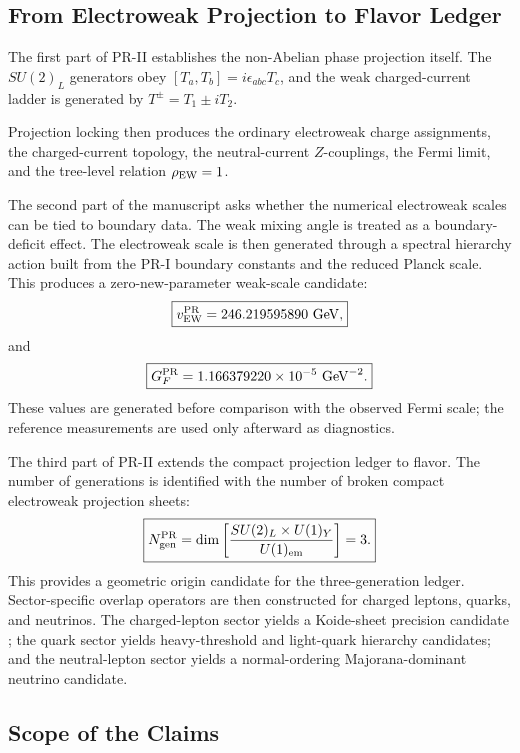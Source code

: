 \documentclass[11pt]{article}
\begin{document}
\subsection{From Electroweak Projection to Flavor Ledger}
\label{sec:intro_pr2_program}

The first part of PR-II establishes the non-Abelian phase projection itself. The \(SU(2)_L\) generators obey $[T_a,T_b] = i\epsilon_{abc}T_c$, and the weak charged-current ladder is generated by $T^\pm = T_1\pm iT_2.$

Projection locking then produces the ordinary electroweak charge assignments, the charged-current topology, the neutral-current \(Z\)-couplings, the Fermi limit, and the tree-level relation $\rho_{\rm EW}=1$.

The second part of the manuscript asks whether the numerical electroweak scales can be tied to boundary data. The weak mixing angle is treated as a boundary-deficit effect. The electroweak scale is then generated through a spectral hierarchy action built from the PR-I boundary constants and the reduced Planck scale. This produces a zero-new-parameter weak-scale candidate:
\begin{equation}
\boxed{
v_{\rm EW}^{\rm PR}
=
246.219595890\ {\rm GeV},
}
\end{equation}
and
\begin{equation}
\boxed{
G_F^{\rm PR}
=
1.166379220\times10^{-5}\ {\rm GeV}^{-2}.
}
\end{equation}
These values are generated before comparison with the observed Fermi scale; the reference measurements are used only afterward as diagnostics.

The third part of PR-II extends the compact projection ledger to flavor. The number of generations is identified with the number of broken compact electroweak projection sheets:
\begin{equation}
\boxed{
N_{\rm gen}^{\rm PR}
=
\dim
\left[
\frac{
SU(2)_L\times U(1)_Y
}{
U(1)_{\rm em}
}
\right]
=
3.
}
\end{equation}
This provides a geometric origin candidate for the three-generation ledger. Sector-specific overlap operators are then constructed for charged leptons, quarks, and neutrinos. The charged-lepton sector yields a Koide-sheet precision candidate \cite{Koide1983}; the quark sector yields heavy-threshold and light-quark hierarchy candidates; and the neutral-lepton sector yields a normal-ordering Majorana-dominant neutrino candidate.

\subsection{Scope of the Claims}
\label{sec:intro_scope}
\end{document}
